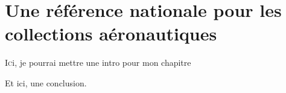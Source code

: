 \chapter[Référence nationale]{\label{I-A}Une référence nationale pour les collections aéronautiques}

\lettrine{I}ci, je pourrai mettre une intro pour mon chapitre






\bigskip
\bigskip
\bigskip

Et ici, une conclusion.